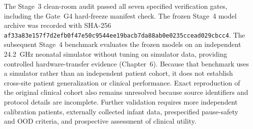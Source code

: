 The Stage~3 clean-room audit passed all seven specified verification gates, including the Gate~G4 hard-freeze manifest check. The frozen Stage~4 model archive was recorded with SHA-256 \texttt{af33a83e\allowbreak 157f7d2e\allowbreak fb0f47e5\allowbreak 0c9544ee\allowbreak 19bacb7d\allowbreak a88ab0e0\allowbreak 235ccead\allowbreak 029cbcc4}. The subsequent Stage~4 benchmark evaluates the frozen models on an independent 24.2~GHz neonatal simulator without tuning on simulator data, providing controlled hardware-transfer evidence (Chapter~6). Because that benchmark uses a simulator rather than an independent patient cohort, it does not establish cross-site patient generalization or clinical performance. Exact reproduction of the original clinical cohort also remains unresolved because source identifiers and protocol details are incomplete. Further validation requires more independent calibration patients, externally collected infant data, prespecified pause-safety and OOD criteria, and prospective assessment of clinical utility.
